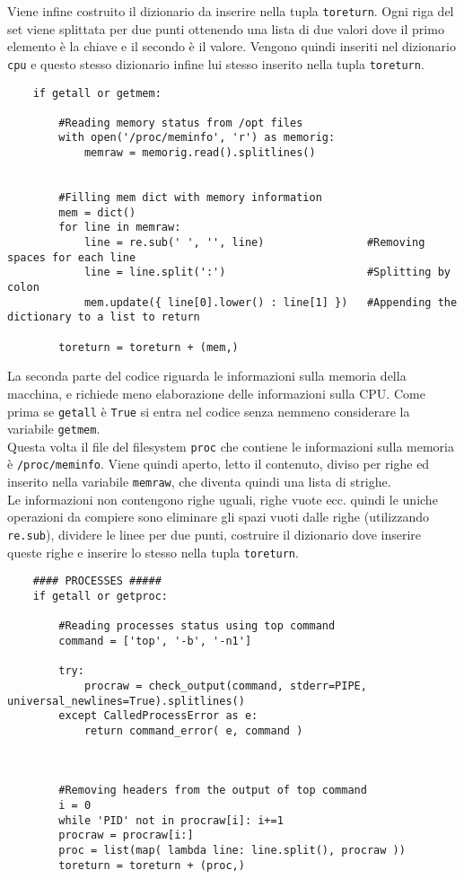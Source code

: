 \documentclass[11pt]{article}
\begin{document}
Viene infine costruito il dizionario da inserire nella tupla \texttt{toreturn}. Ogni riga del set viene splittata per
due punti ottenendo una lista di due valori dove il primo elemento è la chiave e il secondo è il valore.  Vengono quindi
inseriti nel dizionario \texttt{cpu} e questo stesso dizionario infine lui stesso inserito nella tupla \texttt{toreturn}.
\begin{lstlisting}
    if getall or getmem:

        #Reading memory status from /opt files
        with open('/proc/meminfo', 'r') as memorig:
            memraw = memorig.read().splitlines()


        #Filling mem dict with memory information
        mem = dict()
        for line in memraw:
            line = re.sub(' ', '', line)                #Removing spaces for each line
            line = line.split(':')                      #Splitting by colon
            mem.update({ line[0].lower() : line[1] })   #Appending the dictionary to a list to return

        toreturn = toreturn + (mem,)
\end{lstlisting}
La seconda parte del codice riguarda le informazioni sulla memoria della macchina, e richiede meno elaborazione delle
informazioni sulla CPU. Come prima se \texttt{getall} è \texttt{True} si entra nel codice
senza nemmeno considerare la variabile \texttt{getmem}.\\
Questa volta il file del filesystem \texttt{proc} che contiene le informazioni sulla memoria è \texttt{/proc/meminfo}.
Viene quindi aperto, letto il contenuto, diviso per righe ed inserito nella variabile \texttt{memraw}, che diventa quindi
una lista di strighe.\\
Le informazioni non contengono righe uguali, righe vuote ecc. quindi le uniche operazioni da compiere sono eliminare
gli spazi vuoti dalle righe (utilizzando \texttt{re.sub}), dividere le linee per due punti, costruire il dizionario
dove inserire queste righe e inserire lo stesso nella tupla \texttt{toreturn}.
\begin{lstlisting}
    #### PROCESSES #####
    if getall or getproc:

        #Reading processes status using top command
        command = ['top', '-b', '-n1']

        try:
            procraw = check_output(command, stderr=PIPE, universal_newlines=True).splitlines()
        except CalledProcessError as e:
            return command_error( e, command )



        #Removing headers from the output of top command
        i = 0
        while 'PID' not in procraw[i]: i+=1
        procraw = procraw[i:]
        proc = list(map( lambda line: line.split(), procraw ))
        toreturn = toreturn + (proc,)
\end{lstlisting}
\end{document}

